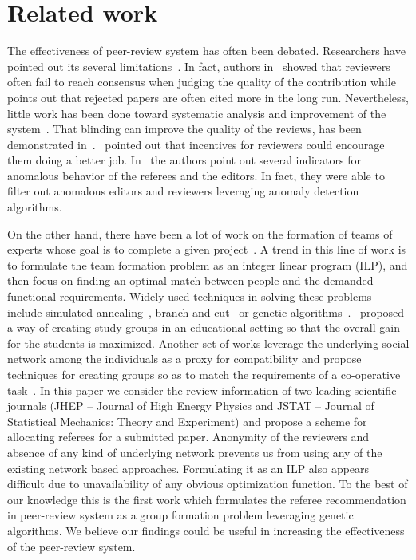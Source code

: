 \noindent
\section{Related work}
\label{related_works}
The effectiveness of peer-review system has often been debated. Researchers have pointed out its several limitations~\cite{ingelfinger1974peer,relman1989good,smith2006peer}. 
In fact, authors in~\cite{cole1981chance} showed that 
reviewers often fail to reach consensus when judging the quality of the contribution while~\cite{braatz2014papers} points out that 
rejected papers are often cited more in the long run. Nevertheless, little work has been done toward systematic analysis and improvement of the 
system~\cite{graffy2006improving}. That blinding can improve the quality of the reviews, has been demonstrated in~\cite{mcnutt1990effects}.~\cite{caswellimproving} pointed 
out that incentives for reviewers could encourage them doing a better job. In~\cite{sikdar2016anomalies} the authors 
point out several indicators for anomalous behavior of the referees and the editors. In fact, they were able to filter out 
anomalous editors and reviewers leveraging anomaly detection algorithms. 

On the other hand, there have been a lot of work on the formation of teams of experts whose goal is to complete a given 
project~\cite{anagnostopoulos2010power,anagnostopoulos2012online, lappas2009finding,agrawal2014grouping,pragarauskas2012multi}. A trend in this line of work is to formulate
the team formation problem as an integer linear program
(ILP), and then focus on finding an optimal match
between people and the demanded functional requirements.
Widely used techniques in solving these problems include simulated
annealing~\cite{baykasoglu2007project}, branch-and-cut~\cite{zzkarian1999forming} or genetic algorithms~\cite{ani2010method}.~\cite{agrawal2014grouping} proposed 
a way of creating study groups in an educational setting so that the overall gain for the 
students is maximized. Another set of works leverage the underlying social network among the individuals as a proxy for compatibility and propose 
techniques for creating groups so as to match the requirements 
of a co-operative task~\cite{majumder2012capacitated,mcdonald2003recommending,wolf2009mining,li2010team}. 
In this paper we consider the review information of two leading scientific 
journals (JHEP -- Journal of High Energy Physics and JSTAT -- Journal of Statistical Mechanics: Theory and Experiment) and propose a scheme 
for allocating referees for a submitted paper. Anonymity of the reviewers and absence of any kind of underlying network 
prevents us from using any of the existing network based approaches. Formulating it as an ILP also appears difficult due to unavailability of any obvious optimization function.
To the best of our knowledge this is the first work which formulates the referee recommendation in peer-review system as a group formation problem 
leveraging genetic algorithms. We believe our findings could be useful in increasing the effectiveness of the peer-review system.

